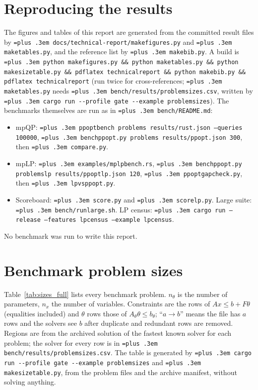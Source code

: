 \documentclass[10pt,a4paper]{article}
\newcommand{\code}[1]{{\let\_\bu\texttt{\spaceskip=\fontdimen2\font plus .3em #1}}}
\newcommand{\bu}{\textunderscore\hspace{0pt}}
\begin{document}
\appendix
\section{Reproducing the results}

The figures and tables of this report are generated from the committed result files by \code{docs/\allowbreak technical-report/\allowbreak make\_figures.py} and \code{make\_tables.py}, and the reference list by \code{make\_bib.py}. A build is
\code{python make\_figures.py \&\& python make\_tables.py \&\& python make\_size\_table.py \&\& pdflatex technical\_report \&\& python make\_bib.py \&\& pdflatex technical\_report} (run twice for cross-references; \code{make\_tables.py} needs \code{bench/results/problem\_sizes.csv}, written by \code{cargo run -{}-profile gate -{}-example problem\_sizes}). The benchmarks themselves are run as in \code{bench/README.md}:
\begin{itemize}
  \item mpQP: \code{ppopt\_bench problems results/rust.json --queries 100000}, \code{bench\_ppopt.py problems results/ppopt.json 300}, then \code{compare.py}.
  \item mpLP: \code{examples/mplp\_bench.rs}, \code{bench\_ppopt.py problems\_lp results/ppopt\_lp.json 120}, \code{ppopt\_gapcheck.py}, then \code{lp\_vs\_ppopt.py}.
  \item Scoreboard: \code{score.py} and \code{score\_lp.py}. Large suite: \code{bench/run\_large.sh}. LP census: \code{cargo run --release --features lp\_census --example lp\_census}.
\end{itemize}
No benchmark was run to write this report.

\section{Benchmark problem sizes}\label{app:sizes}

Table~\ref{tab:sizes_full} lists every benchmark problem. $n_\theta$ is the number of parameters, $n_x$ the number of variables. Constraints are the rows of
$Ax\le b+F\theta$ (equalities included) and $\theta$ rows those of $A_\theta\theta\le b_\theta$; ``$a\to b$'' means the file has $a$ rows and the solvers see $b$ after duplicate and
redundant rows are removed. Regions are from the archived solution of the fastest known solver for each problem; the solver for every row is in
\code{bench/results/problem\_sizes.csv}. The table is generated by \code{cargo run -{}-profile gate -{}-example problem\_sizes} and \code{make\_size\_table.py}, from the problem files and the archive manifest, without solving anything.




\end{document}
